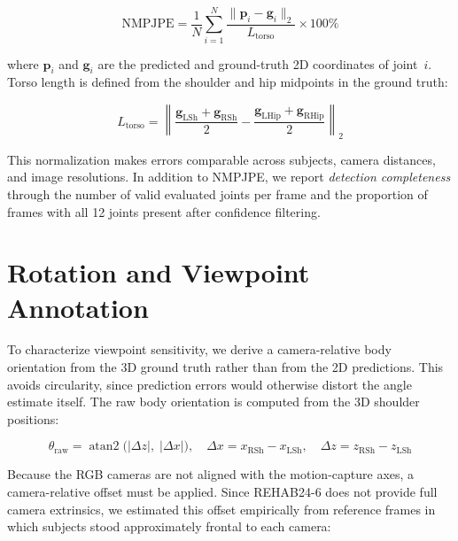 \begin{equation}
  \text{NMPJPE} = \frac{1}{N} \sum_{i=1}^{N} \frac{\lVert \mathbf{p}_i - \mathbf{g}_i \rVert_2}{L_{\text{torso}}} \times 100\%
  \label{eq:nmpjpe}
\end{equation}

\noindent where $\mathbf{p}_i$ and $\mathbf{g}_i$ are the predicted and ground-truth 2D coordinates of joint~$i$. Torso length is defined from the shoulder and hip midpoints in the ground truth:

\begin{equation}
  L_{\text{torso}} =
  \left\lVert
  \frac{\mathbf{g}_{\text{LSh}} + \mathbf{g}_{\text{RSh}}}{2}
  -
  \frac{\mathbf{g}_{\text{LHip}} + \mathbf{g}_{\text{RHip}}}{2}
  \right\rVert_2
  \label{eq:torso}
\end{equation}

This normalization makes errors comparable across subjects, camera distances, and image resolutions. In addition to NMPJPE, we report \emph{detection completeness} through the number of valid evaluated joints per frame and the proportion of frames with all 12 joints present after confidence filtering.

\section{Rotation and Viewpoint Annotation}
\label{sec:rotation}

To characterize viewpoint sensitivity, we derive a camera-relative body orientation from the 3D ground truth rather than from the 2D predictions. This avoids circularity, since prediction errors would otherwise distort the angle estimate itself. The raw body orientation is computed from the 3D shoulder positions:

\begin{equation}
  \theta_{\text{raw}} = \operatorname{atan2}\!\bigl(|\Delta z|,\; |\Delta x|\bigr), \quad
  \Delta x = x_{\text{RSh}} - x_{\text{LSh}}, \quad
  \Delta z = z_{\text{RSh}} - z_{\text{LSh}}
  \label{eq:rotation-raw}
\end{equation}

Because the RGB cameras are not aligned with the motion-capture axes, a camera-relative offset must be applied. Since REHAB24-6 does not provide full camera extrinsics, we estimated this offset empirically from reference frames in which subjects stood approximately frontal to each camera:

